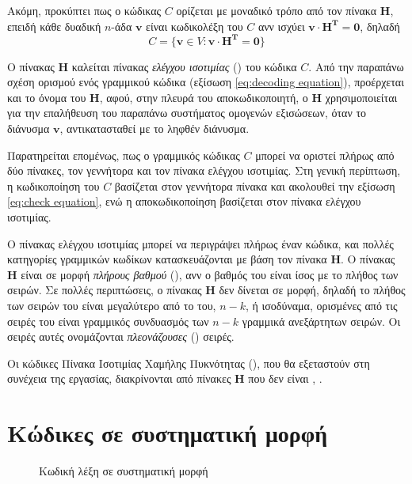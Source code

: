 Ακόμη, προκύπτει πως ο κώδικας $C$ ορίζεται με μοναδικό τρόπο από τον πίνακα $\mathbf{H}$, επειδή κάθε δυαδική $n$-άδα $\mathbf{v}$ είναι κωδικολέξη του $C$ ανν
ισχύει $\mathbf{v} \cdot \mathbf{H^T} = \mathbf{0}$, δηλαδή
\begin{equation}
C=\lbrace\mathbf{v}\in V:\mathbf{v} \cdot \mathbf{H^T} = \mathbf{0}\rbrace
\label{eq:decoding equation}
\end{equation}

Ο πίνακας $\mathbf{H}$ καλείται πίνακας \textit{ελέγχου ισοτιμίας} () του κώδικα $C$. Από την παραπάνω σχέση ορισμού ενός γραμμικού κώδικα (εξίσωση \ref{eq:decoding equation}), προέρχεται και το όνομα του $\mathbf{H}$, αφού, στην πλευρά του αποκωδικοποιητή, ο $\mathbf{H}$ χρησιμοποιείται για την επαλήθευση του παραπάνω συστήματος ομογενών εξισώσεων, όταν το διάνυσμα $\mathbf{v}$, αντικατασταθεί με το ληφθέν διάνυσμα.

Παρατηρείται επομένως, πως ο γραμμικός  κώδικας $C$ μπορεί να οριστεί πλήρως από δύο πίνακες, τον γεννήτορα και τον πίνακα ελέγχου ισοτιμίας. Στη γενική περίπτωση, η κωδικοποίηση του $C$ βασίζεται στον γεννήτορα πίνακα και ακολουθεί την εξίσωση \ref{eq:check equation}, ενώ η αποκωδικοποίηση βασίζεται στον πίνακα ελέγχου ισοτιμίας.

Ο πίνακας ελέγχου ισοτιμίας μπορεί να περιγράψει πλήρως έναν κώδικα, και πολλές κατηγορίες γραμμικών  κωδίκων κατασκευάζονται με βάση τον πίνακα $\mathbf{H}$. Ο πίνακας $\mathbf{H}$ είναι σε μορφή \textit{πλήρους βαθμού} (), ανν ο βαθμός του είναι ίσος με το πλήθος των σειρών. Σε πολλές περιπτώσεις, ο πίνακας $\mathbf{H}$ δεν δίνεται σε  μορφή, δηλαδή το πλήθος των σειρών του είναι μεγαλύτερο από το  του, $n-k$, ή ισοδύναμα, ορισμένες από τις σειρές του είναι γραμμικός συνδυασμός των $n-k$ γραμμικά ανεξάρτητων σειρών. Οι σειρές αυτές ονομάζονται \textit{πλεονάζουσες} () σειρές. 

Οι κώδικες Πίνακα Ισοτιμίας Χαμήλης Πυκνότητας (), που θα εξεταστούν στη συνέχεια της εργασίας, διακρίνονται από πίνακες $\mathbf{H}$ που δεν είναι  \cite{cover2012elements}, \cite{ryan2009channel}.

\section{Κώδικες σε συστηματική μορφή}

\begin{figure}[h]
\caption{Κωδική λέξη σε συστηματική μορφή}
\label{fig:systematic form}
\end{figure}

